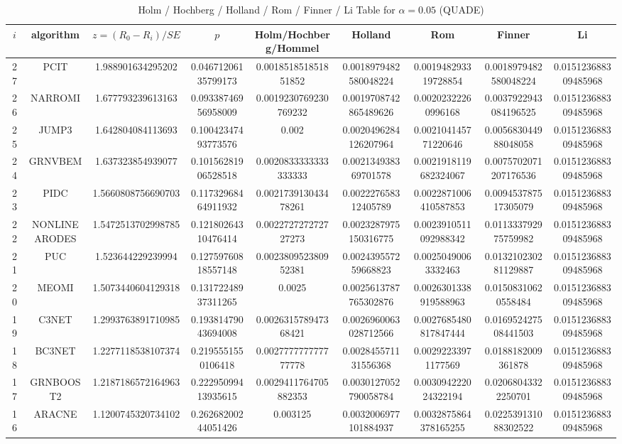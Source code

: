 \documentclass[a4paper,10pt]{article}
\begin{document}
\begin{landscape}
\begin{table}[!htp]
\centering\scriptsize
\caption{Holm / Hochberg / Holland / Rom / Finner / Li Table for $\alpha=0.05$ (QUADE)}
\begin{tabular}{ccccccccc}
$i$&algorithm&$z=(R_0 - R_i)/SE$&$p$&Holm/Hochberg/Hommel&Holland&Rom&Finner&Li\\
\hline
27&PCIT&1.988901634295202&0.04671206135799173&0.001851851851851852&0.0018979482580048224&0.001948293319728854&0.0018979482580048224&0.015123688309485968\\
26&NARROMI&1.677793239613163&0.09338746956958009&0.0019230769230769232&0.0019708742865489626&0.00202322260996168&0.0037922943084196525&0.015123688309485968\\
25&JUMP3&1.642804084113693&0.10042347493773576&0.002&0.0020496284126207964&0.002104145771220646&0.005683044988048058&0.015123688309485968\\
24&GRNVBEM&1.637323854939077&0.10156281906528518&0.0020833333333333333&0.002134938369701578&0.0021918119682324067&0.0075702071207176536&0.015123688309485968\\
23&PIDC&1.5660808756690703&0.11732968464911932&0.002173913043478261&0.002227658312405789&0.0022871006410587853&0.009453787517305079&0.015123688309485968\\
22&NONLINEARODES&1.5472513702998785&0.12180264310476414&0.002272727272727273&0.0023287975150316775&0.0023910511092988342&0.011333792975759982&0.015123688309485968\\
21&PUC&1.523644229239994&0.12759760818557148&0.002380952380952381&0.002439557259668823&0.00250490063332463&0.013210230281129887&0.015123688309485968\\
20&MEOMI&1.5073440604129318&0.13172248937311265&0.0025&0.0025613787765302876&0.0026301338919588963&0.01508310620558484&0.015123688309485968\\
19&C3NET&1.2993763891710985&0.19381479043694008&0.002631578947368421&0.0026960063028712566&0.0027685480817847444&0.016952427508441503&0.015123688309485968\\
18&BC3NET&1.2277118538107374&0.2195551550106418&0.002777777777777778&0.002845571131556368&0.00292233971177569&0.0188182009361878&0.015123688309485968\\
17&GRNBOOST2&1.2187186572164963&0.22295099413935615&0.0029411764705882353&0.0030127052790058784&0.003094222024322194&0.02068043322250701&0.015123688309485968\\
16&ARACNE&1.1200745320734102&0.26268200244051426&0.003125&0.0032006977101884937&0.0032875864378165255&0.022539131088302522&0.015123688309485968\\

\end{tabular}
\end{table}
\end{landscape}
\end{document}
